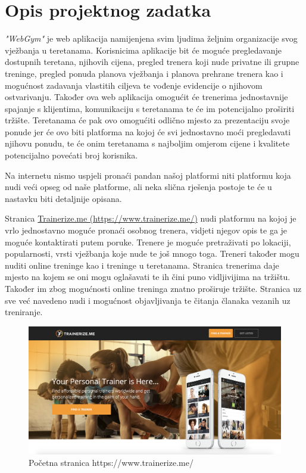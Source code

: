 \chapter{Opis projektnog zadatka}
		
		\textit{"WebGym"} je web aplikacija namijenjena svim ljudima željnim organizacije 
		svog vježbanja u teretanama. Korisnicima aplikacije bit će moguće pregledavanje 
		dostupnih teretana, njihovih cijena, pregled trenera koji nude privatne ili grupne 
		treninge, pregled ponuda planova vježbanja i planova prehrane trenera kao i 
		mogućnost zadavanja vlastitih ciljeva te vođenje evidencije o njihovom ostvarivanju.
		Također ova web aplikacija omogućit će trenerima jednostavnije spajanje s klijentima,
		komunikaciju s teretanama te će im potencijalno proširiti tržište. Teretanama će pak 
		ovo omogućiti odlično mjesto za prezentaciju svoje ponude jer će ovo biti platforma 
		na kojoj će svi jednostavno moći pregledavati njihovu ponudu, te će onim teretanama 
		s najboljim omjerom cijene i kvalitete potencijalno povećati broj korisnika. 
		
		\vspace{5mm}
		
		Na internetu nismo uspjeli pronaći pandan našoj platformi niti platformu koja 
		nudi veći opseg od naše platforme, ali neka slična rješenja postoje te će u nastavku 
		biti detaljnije opisana. 
		
		Stranica \href{https://www.trainerize.me/}{Trainerize.me (https://www.trainerize.me/)} nudi platformu na kojoj je vrlo jednostavno moguće pronaći osobnog trenera, vidjeti 
		njegov opis te ga je moguće kontaktirati putem poruke. Trenere je moguće pretraživati po lokaciji, popularnosti, vrsti vježbanja koje nude te još mnogo toga. 
		Treneri također mogu nuditi online treninge kao i treninge u teretanama. Stranica 
		trenerima daje mjesto na kojem se oni mogu oglašavati te ih čini puno vidljivijima na 
		tržištu. Također im zbog mogućnosti online treninga znatno proširuje tržište. Stranica uz sve već navedeno nudi i mogućnost objavljivanja te čitanja članaka 
		vezanih uz treniranje.
		
		\begin{figure}[H]
			\includegraphics[scale=0.20]{slike/trainerizeme1.PNG} %
			\centering
			\caption{Početna stranica https://www.trainerize.me/}
			\label{fig:promjene}
		\end{figure}
	
